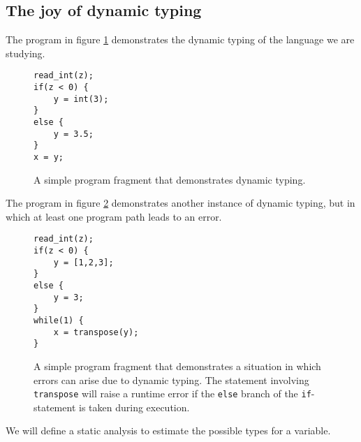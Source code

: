 \documentclass[11pt,letterpaper]{article}
\begin{document}
\subsection{The joy of dynamic typing}

The program in figure \ref{fig:dynamic-1} demonstrates the dynamic typing of
the language we are studying.

\begin{figure}[ht]
    \begin{lstlisting}
read_int(z);
if(z < 0) {
    y = int(3);
}
else {
    y = 3.5;
}
x = y;
    \end{lstlisting}

    \caption{A simple program fragment that demonstrates dynamic typing.}
    \label{fig:dynamic-1}
\end{figure}

The program in figure \ref{fig:dynamic-2} demonstrates another instance of
dynamic typing, but in which at least one program path leads to an error.

\begin{figure}[ht]
    \begin{lstlisting}
read_int(z);
if(z < 0) {
    y = [1,2,3];
}
else {
    y = 3;
}
while(1) {
    x = transpose(y);
}
    \end{lstlisting}

    \caption{
        A simple program fragment that demonstrates a situation in which errors
        can arise due to dynamic typing. The statement involving
        \texttt{transpose} will raise a runtime error if the \texttt{else}
        branch of the \texttt{if}-statement is taken during execution.
    }
    \label{fig:dynamic-2}
\end{figure}

We will define a static analysis to estimate the possible types for a variable.
\end{document}
